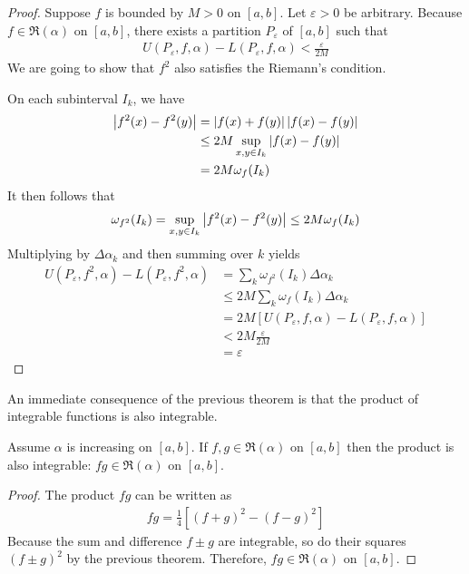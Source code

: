 \documentclass[thmcnt=section, color=blue, 12pt]{my-elegantbook}
\begin{document}
\begin{proof}
	Suppose $f$ is bounded by $M > 0$ on $[a, b]$.
	Let $\varepsilon > 0$ be arbitrary.
	Because $f \in \mathfrak{R}(\alpha)$ on $[a, b]$,
	there exists a partition $P_\varepsilon$ of $[a, b]$
	such that
	\begin{align*}
		U(P_\varepsilon, f, \alpha) - L(P_\varepsilon, f, \alpha)
		< \frac{\varepsilon}{2M}
	\end{align*}
	We are going to show that $f^2$ also satisfies the Riemann's condition.

	On each subinterval $I_k$, we have
	\begin{align*}
		\left\lvert f^2(x) - f^2(y) \right\rvert
		 & = \left\lvert f(x) + f(y) \right\rvert \left\lvert f(x) - f(y) \right\rvert         \\
		 & \leq 2M \sup_{x, y \in I_k} \left\lvert f(x) - f(y) \right\rvert \\
		 & = 2M \omega_f(I_k)
	\end{align*}
	It then follows that
	\begin{align*}
		\omega_{f^2}(I_k)
		= \sup_{x, y \in I_k} \left\lvert f^2(x) - f^2(y) \right\rvert
		\leq 2M \omega_f(I_k)
	\end{align*}
	Multiplying by $\Delta \alpha_k$ and then summing over $k$ yields
	\begin{align*}
		U(P_\varepsilon, f^2, \alpha) - L(P_\varepsilon, f^2, \alpha)
		 & = \sum_{k} \omega_{f^2}(I_k) \Delta \alpha_k                     \\
		 & \leq 2M \sum_{k} \omega_f(I_k) \Delta \alpha_k                   \\
		 & = 2M [U(P_\varepsilon, f, \alpha) - L(P_\varepsilon, f, \alpha)] \\
		 & < 2M \frac{\varepsilon}{2M}                                      \\
		 & = \varepsilon
	\end{align*}
\end{proof}

An immediate consequence of the previous theorem is that
the product of integrable functions is also integrable.

\begin{theorem} \label{thm:14}
	Assume $\alpha$ is increasing on $[a, b]$.
	If $f, g \in \mathfrak{R}(\alpha)$ on $[a, b]$
	then the product is also integrable: $fg \in \mathfrak{R}(\alpha)$ on $[a, b]$.
\end{theorem}

\begin{proof}
	The product $fg$ can be written as
	\begin{align*}
		fg = \frac{1}{4}[ (f+g)^2 - (f-g)^2 ]
	\end{align*}
	Because the sum and difference $f \pm g$ are integrable,
	so do their squares $(f \pm g)^2$ by the previous theorem.
	Therefore, $fg \in \mathfrak{R}(\alpha)$ on $[a, b]$.
\end{proof}
\end{document}
